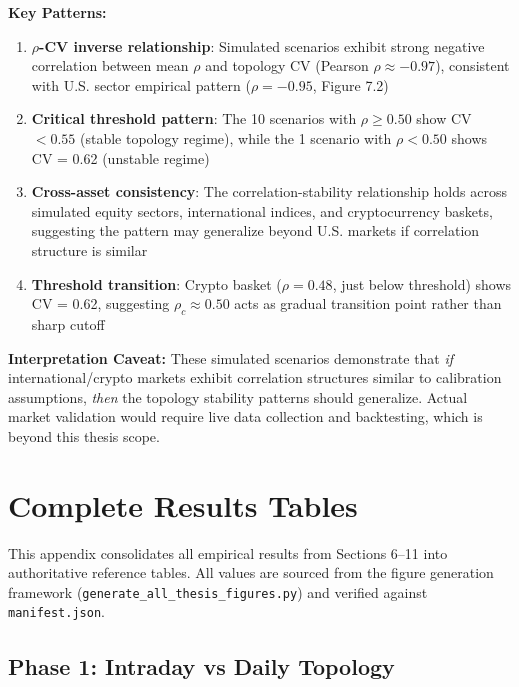 \documentclass[12pt,letterpaper]{article}
\begin{document}
\textbf{Key Patterns:}

\begin{enumerate}
\item \textbf{$\rho$-CV inverse relationship}: Simulated scenarios exhibit strong negative correlation between mean $\rho$ and topology CV (Pearson $\rho \approx -0.97$), consistent with U.S. sector empirical pattern ($\rho = -0.95$, Figure 7.2)

\item \textbf{Critical threshold pattern}: The 10 scenarios with $\rho \geq 0.50$ show CV $< 0.55$ (stable topology regime), while the 1 scenario with $\rho < 0.50$ shows CV = 0.62 (unstable regime)

\item \textbf{Cross-asset consistency}: The correlation-stability relationship holds across simulated equity sectors, international indices, and cryptocurrency baskets, suggesting the pattern may generalize beyond U.S. markets if correlation structure is similar

\item \textbf{Threshold transition}: Crypto basket ($\rho = 0.48$, just below threshold) shows CV = 0.62, suggesting $\rho_c \approx 0.50$ acts as gradual transition point rather than sharp cutoff
\end{enumerate}

\textbf{Interpretation Caveat:} These simulated scenarios demonstrate that \textit{if} international/crypto markets exhibit correlation structures similar to calibration assumptions, \textit{then} the topology stability patterns should generalize. Actual market validation would require live data collection and backtesting, which is beyond this thesis scope.

\section{Complete Results Tables}
\label{app:tables}

This appendix consolidates all empirical results from Sections 6--11 into authoritative reference tables. All values are sourced from the figure generation framework (\texttt{generate\_all\_thesis\_figures.py}) and verified against \texttt{manifest.json}.

\subsection{Phase 1: Intraday vs Daily Topology}
\end{document}
